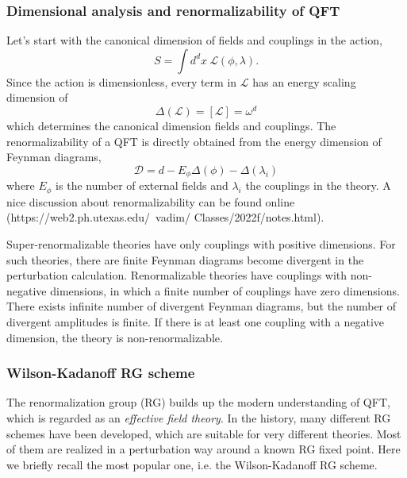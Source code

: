 \documentclass[submission, PhysLectNotes]{SciPost}
\begin{document}
\subsubsection{Dimensional analysis and renormalizability of QFT}
Let's start with the canonical dimension of fields and couplings in the action,
\begin{equation}
    S = \int d^dx \ \mathcal{L}(\phi, \lambda).
\end{equation}
Since the action is dimensionless, every term in $\mathcal{L}$ has an energy scaling dimension of
\begin{equation}
    \Delta(\mathcal{L}) = [\mathcal{L}] = \omega^d
\end{equation}
which determines the canonical dimension fields and couplings. The renormalizability of a QFT is directly obtained from the energy dimension of Feynman diagrams,
\begin{equation}
    \mathcal{D} = d - E_{\phi} \Delta (\phi) - \Delta (\lambda_i)
\end{equation}
where $E_{\phi}$ is the number of external fields and $\lambda_i$ the couplings in the theory. A nice discussion about renormalizability can be found online (https://web2.ph.utexas.edu/~vadim/
Classes/2022f/notes.html).

Super-renormalizable theories have only couplings with positive dimensions. For such theories, there are finite Feynman diagrams become divergent in the perturbation calculation. Renormalizable theories have couplings with non-negative dimensions, in which a finite number of couplings have zero dimensions. There exists infinite number of divergent Feynman diagrams, but the number of divergent amplitudes is finite. If there is at least one coupling with a negative dimension, the theory is non-renormalizable.

\subsubsection{Wilson-Kadanoff RG scheme}
The renormalization group (RG) builds up the modern understanding of QFT, which is regarded as an {\it effective field theory}. In the history, many different RG schemes have been developed, which are suitable for very different theories. Most of them are realized in a perturbation way around a known RG fixed point. Here we briefly recall the most popular one, i.e. the Wilson-Kadanoff RG scheme. 
\end{document}

